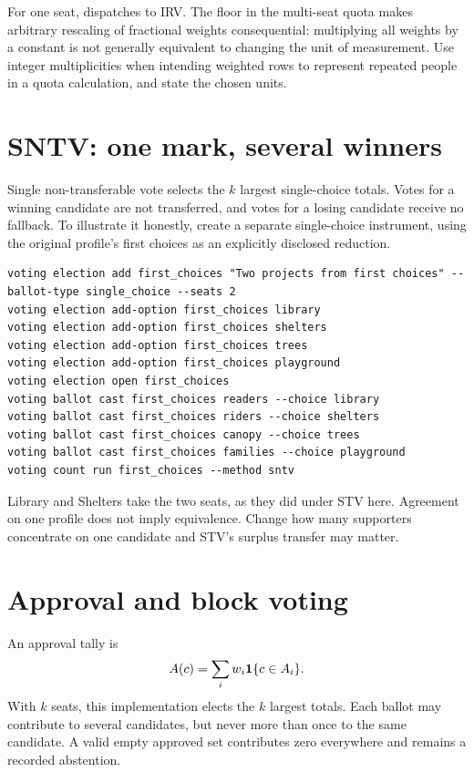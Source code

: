 For one seat,  dispatches to IRV. The floor in the multi-seat quota makes arbitrary rescaling of fractional weights consequential: multiplying all weights by a constant is not generally equivalent to changing the unit of measurement. Use integer multiplicities when intending weighted rows to represent repeated people in a quota calculation, and state the chosen units.

\section{SNTV: one mark, several winners}
Single non-transferable vote selects the $k$ largest single-choice totals. Votes for a winning candidate are not transferred, and votes for a losing candidate receive no fallback. To illustrate it honestly, create a separate single-choice instrument, using the original profile's first choices as an explicitly disclosed reduction.
\begin{lstlisting}[style=votingrun]
voting election add first_choices "Two projects from first choices" --ballot-type single_choice --seats 2
voting election add-option first_choices library
voting election add-option first_choices shelters
voting election add-option first_choices trees
voting election add-option first_choices playground
voting election open first_choices
voting ballot cast first_choices readers --choice library
voting ballot cast first_choices riders --choice shelters
voting ballot cast first_choices canopy --choice trees
voting ballot cast first_choices families --choice playground
voting count run first_choices --method sntv
\end{lstlisting}
Library and Shelters take the two seats, as they did under STV here. Agreement on one profile does not imply equivalence. Change how many supporters concentrate on one candidate and STV's surplus transfer may matter.

\section{Approval and block voting}
An approval tally is
\[
A(c)=\sum_i w_i\mathbf{1}\{c\in A_i\}.
\]
With $k$ seats, this implementation elects the $k$ largest totals. Each ballot may contribute to several candidates, but never more than once to the same candidate. A valid empty approved set contributes zero everywhere and remains a recorded abstention.

